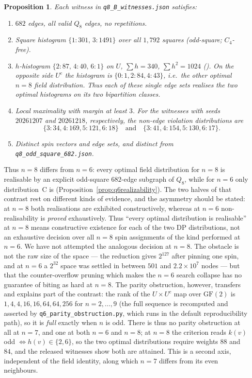 \documentclass[12pt,a4paper]{article}
\newtheorem{proposition}[theorem]{Proposition}
\theoremstyle{definition}
\begin{document}
\begin{proposition}\label{prop:q8Boddsquare}
Each witness in \texttt{q8\_B\_witnesses.json} satisfies:
\begin{enumerate}[label=(\roman*)]
  \item $682$ edges, all valid $Q_8$ edges, no repetitions.
  \item Square histogram $\{1{:}301,\,3{:}1491\}$ over all
    $1{,}792$ squares (odd-square; $C_4$-free).
  \item $h$-histogram $\{2{:}87,\,4{:}40,\,6{:}1\}$ on $U$,
    $\sum h=340$, $\sum h^2=1024$ (\checkmark). On the opposite side
    $U^c$ the histogram is $\{0{:}1,2{:}84,4{:}43\}$, i.e.\ the other
    optimal $n=8$ field distribution. Thus each of these single edge sets
    realises the two optimal histograms on its two bipartition classes.
  \item Local maximality with margin at least $3$.  For the witnesses with
    seeds $20261207$ and $20261218$, respectively, the non-edge violation
    distributions are
    \[
      \{3{:}34,4{:}169,5{:}121,6{:}18\}
      \quad\text{and}\quad
      \{3{:}41,4{:}154,5{:}130,6{:}17\}.
    \]
  \item Distinct spin vectors and edge sets, and distinct from
    \texttt{q8\_odd\_square\_682.json}.
\end{enumerate}
\end{proposition}

Thus $n=8$ differs from $n=6$: every optimal field distribution for $n=8$ is
realisable by an explicit odd-square $682$-edge subgraph of $Q_8$, while for
$n=6$ only distribution~C is (Proposition~\ref{prop:q6realizability}). The two
halves of that contrast rest on different kinds of evidence, and the asymmetry
should be stated: at $n=8$ both realisations are exhibited constructively,
whereas at $n=6$ non-realisability is \emph{proved} exhaustively. Thus
``every optimal distribution is realisable'' at $n=8$ means constructive
existence for each of the two DP distributions, not an exhaustive decision
over all $n=8$ spin assignments of the kind performed at $n=6$. We have not
attempted the analogous decision at $n=8$. The obstacle is not
the raw size of the space --- the reduction gives $2^{127}$ after pinning one
spin, and at $n=6$ a $2^{32}$ space was settled in between $501$ and
$2.2\times10^{7}$ nodes --- but that the counter-overflow pruning which makes
the $n=6$ search collapse has no guarantee of biting as hard at $n=8$. The
parity obstruction, however, transfers and explains part of the contrast: the
rank of the $U\times U^{c}$ map over $\mathrm{GF}(2)$ is
$1,4,4,16,16,64,64,256$ for $n=2,\ldots,9$ (the full sequence is
recomputed and asserted by \texttt{q6\_parity\_obstruction.py}, which runs
in the default reproducibility path), so it is \emph{full} exactly when
$n$ is odd. There is thus no parity obstruction at all at $n=7$, and one at
both $n=6$ and $n=8$; at $n=8$ the criterion reads $k(v)$ odd
$\iff h(v)\in\{2,6\}$, so the two optimal distributions require weights $88$
and $84$, and the released witnesses show both are attained. This is a second
axis, independent of the field identity, along which $n=7$ differs from its
even neighbours.
\end{document}
